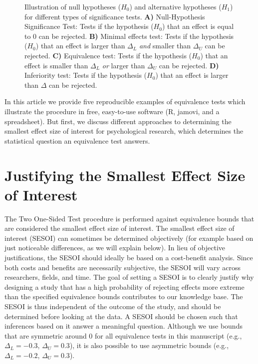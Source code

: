 \documentclass[english,floatsintext,man]{apa6}
\theoremstyle{definition}
\theoremstyle{definition}
\theoremstyle{definition}
\theoremstyle{remark}
\begin{document}
\begin{figure}
\caption{\label{fig:unnamed-chunk-2}Illustration of null hypotheses
(\(H_0\)) and alternative hypotheses (\(H_1\)) for different types of
significance tests. \textbf{A)} Null-Hypothesis Significance Test: Tests
if the hypothesis (\(H_0\)) that an effect is equal to 0 can be
rejected. \textbf{B)} Minimal effects test: Tests if the hypothesis
(\(H_0\)) that an effect is larger than \(\Delta_{L}\) \emph{and}
smaller than \(\Delta_{U}\) can be rejected. \textbf{C)} Equivalence
test: Tests if the hypothesis (\(H_0\)) that an effect is smaller than
\(\Delta_{L}\) \emph{or} larger than \(\Delta_{U}\) can be rejected.
\textbf{D)} Inferiority test: Tests if the hypothesis (\(H_0\)) that an
effect is larger than \(\Delta\) can be rejected.}
\end{figure}

In this article we provide five reproducible examples of equivalence
tests which illustrate the procedure in free, easy-to-use software (R,
jamovi, and a spreadsheet). But first, we discuss different approaches
to determining the smallest effect size of interest for psychological
research, which determines the statistical question an equivalence test
answers.

\section{Justifying the Smallest Effect Size of
Interest}\label{justifying-the-smallest-effect-size-of-interest}

The Two One-Sided Test procedure is performed against equivalence bounds
that are considered the smallest effect size of interest. The smallest
effect size of interest (SESOI) can sometimes be determined objectively
(for example based on just noticeable differences, as we will explain
below). In lieu of objective justifications, the SESOI should ideally be
based on a cost-benefit analysis. Since both costs and benefits are
necessarily subjective, the SESOI will vary across researchers, fields,
and time. The goal of setting a SESOI is to clearly justify why
designing a study that has a high probability of rejecting effects more
extreme than the specified equivalence bounds contributes to our
knowledge base. The SESOI is thus independent of the outcome of the
study, and should be determined before looking at the data. A SESOI
should be chosen such that inferences based on it answer a meaningful
question. Although we use bounds that are symmetric around 0 for all
equivalence tests in this manuscript (e.g., \(\Delta_{L} = -0.3\),
\(\Delta_{U} = 0.3\)), it is also possible to use asymmetric bounds
(e.g., \(\Delta_{L} = -0.2\), \(\Delta_{U} = 0.3\)).
\end{document}
